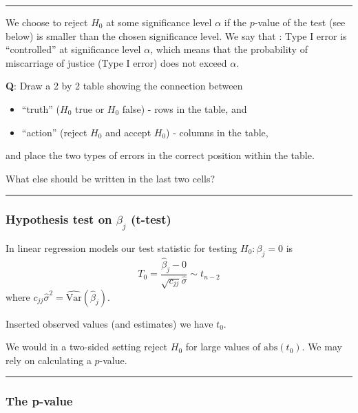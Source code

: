 \documentclass[]{article}
\providecommand{\tightlist}{%
  \setlength{\itemsep}{0pt}\setlength{\parskip}{0pt}}
\begin{document}
\begin{center}\rule{0.5\linewidth}{\linethickness}\end{center}

We choose to reject \(H_0\) at some significance level \(\alpha\) if the
\(p\)-value of the test (see below) is smaller than the chosen
significance level. We say that : Type I error is ``controlled'' at
significance level \(\alpha\), which means that the probability of
miscarriage of justice (Type I error) does not exceed \(\alpha\).

\textbf{Q}: Draw a 2 by 2 table showing the connection between

\begin{itemize}
\tightlist
\item
  ``truth'' (\(H_0\) true or \(H_0\) false) - rows in the table, and
\item
  ``action'' (reject \(H_0\) and accept \(H_0\)) - columns in the table,
\end{itemize}

and place the two types of errors in the correct position within the
table.

What else should be written in the last two cells?

\begin{center}\rule{0.5\linewidth}{\linethickness}\end{center}

\hypertarget{hypothesis-test-on-beta_j-t-test}{%
\subsubsection{\texorpdfstring{Hypothesis test on \(\beta_j\)
(t-test)}{Hypothesis test on \textbackslash{}beta\_j (t-test)}}\label{hypothesis-test-on-beta_j-t-test}}

In linear regression models our test statistic for testing
\(H_0: \beta_j=0\) is
\[T_0=\frac{\hat{\beta}_j-0}{\sqrt{c_{jj}}\hat{\sigma}}\sim t_{n-2}\]
where \(c_{jj}\hat{\sigma}^2=\widehat{\text{Var}}(\hat{\beta}_j)\).

Inserted observed values (and estimates) we have \(t_0\).

We would in a two-sided setting reject \(H_0\) for large values of
\(\text{abs}(t_0)\). We may rely on calculating a \(p\)-value.

\begin{center}\rule{0.5\linewidth}{\linethickness}\end{center}

\hypertarget{the-p-value}{%
\subsubsection{The p-value}\label{the-p-value}}
\end{document}
